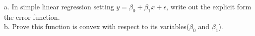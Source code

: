 \documentclass[12pt]{article}
\begin{document}
 {
 a. In simple linear regression setting $y=\beta_0+\beta_1x+\epsilon$, write out the explicit form the error function.\\
 b. Prove this function is convex with respect to its variables($\beta_0$ and $\beta_1$). }
 { \vfill
  \answer
} {}




\problemsdone
\end{document}
